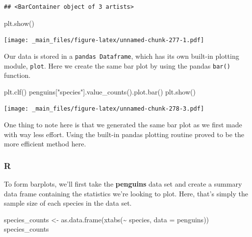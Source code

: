 \documentclass[
]{book}
\newenvironment{Shaded}{\begin{snugshade}}{\end{snugshade}}
\newcommand{\AttributeTok}[1]{\textcolor[rgb]{0.77,0.63,0.00}{#1}}
\newcommand{\FunctionTok}[1]{\textcolor[rgb]{0.00,0.00,0.00}{#1}}
\newcommand{\NormalTok}[1]{#1}
\newcommand{\OtherTok}[1]{\textcolor[rgb]{0.56,0.35,0.01}{#1}}
\newcommand{\SpecialCharTok}[1]{\textcolor[rgb]{0.00,0.00,0.00}{#1}}
\newcommand{\StringTok}[1]{\textcolor[rgb]{0.31,0.60,0.02}{#1}}
\begin{document}
\begin{verbatim}
## <BarContainer object of 3 artists>
\end{verbatim}

\begin{Shaded}
\begin{Highlighting}[]
\NormalTok{plt.show()}
\end{Highlighting}
\end{Shaded}

\texttt{[image: \_main\_files/figure-latex/unnamed-chunk-277-1.pdf]}

Our data is stored in a \texttt{pandas\ Dataframe}, which has its own built-in plotting module, \texttt{plot}. Here we create the same bar plot by using the pandas \texttt{bar()} function.

\begin{Shaded}
\begin{Highlighting}[]
\NormalTok{plt.clf()}
\NormalTok{penguins[}\StringTok{"species"}\NormalTok{].value\_counts().plot.bar()}
\NormalTok{plt.show()}
\end{Highlighting}
\end{Shaded}

\texttt{[image: \_main\_files/figure-latex/unnamed-chunk-278-3.pdf]}

One thing to note here is that we generated the same bar plot as we first made with way less effort. Using the built-in pandas plotting routine proved to be the more efficient method here.

\hypertarget{r-42}{%
\subsubsection*{R}\label{r-42}}

To form barplots, we'll first take the \textbf{penguins} data set and create a summary data frame containing the statistics we're looking to plot. Here, that's simply the sample size of each species in the data set.

\begin{Shaded}
\begin{Highlighting}[]
\NormalTok{species\_counts }\OtherTok{\textless{}{-}} \FunctionTok{as.data.frame}\NormalTok{(}\FunctionTok{xtabs}\NormalTok{(}\SpecialCharTok{\textasciitilde{}}\NormalTok{ species, }\AttributeTok{data =}\NormalTok{ penguins))}
\NormalTok{species\_counts}
\end{Highlighting}
\end{Shaded}
\end{document}
